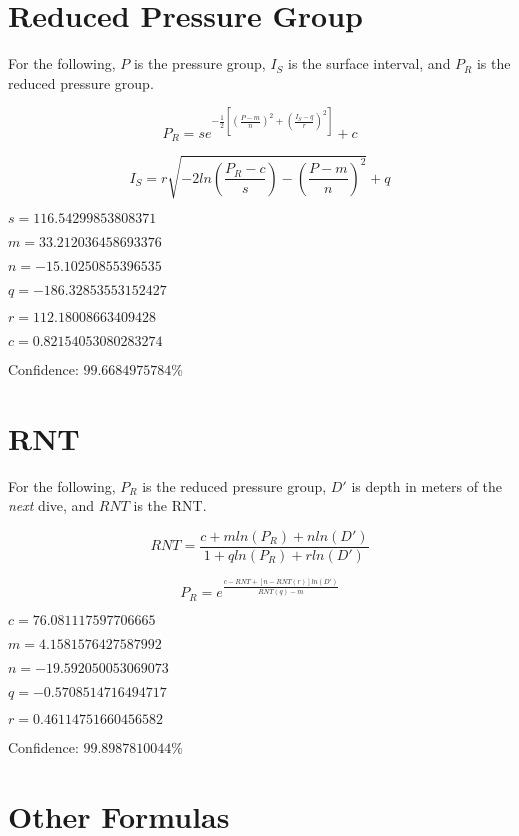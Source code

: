 \documentclass[17pt]{article}
\begin{document}
\newpage

\section{Reduced Pressure Group}

For the following, $P$ is the pressure group, $I_S$ is the surface interval, and $P_R$ is the reduced pressure group.

$$P_R = se^{-\frac{1}{2}\left[\left(\frac{P - m}{n}\right)^2 + \left(\frac{I_S - q}{r}\right)^2\right]} + c$$

$$I_S = r\sqrt{-2ln\left(\frac{P_R - c}{s}\right) - \left(\frac{P - m}{n}\right)^2} + q$$

$s = 116.54299853808371$

$m = 33.212036458693376$

$n = -15.10250855396535$

$q = -186.32853553152427$

$r = 112.18008663409428$

$c = 0.82154053080283274$

Confidence: $99.6684975784\%$

\newpage

\section{RNT}

For the following, $P_R$ is the reduced pressure group, $D'$ is depth in meters of the \emph{next} dive, and $RNT$ is the RNT.

$$RNT = \frac{c + mln(P_R) + nln(D')}{1 + qln(P_R) + rln(D')}$$

$$P_R = e^\frac{c - RNT + [n - RNT(r)]ln(D')}{RNT(q) - m}$$

$c = 76.081117597706665$

$m = 4.1581576427587992$

$n = -19.592050053069073$

$q = -0.5708514716494717$

$r = 0.46114751660456582$

Confidence: $99.8987810044\%$

\newpage

\section{Other Formulas}
\end{document}
